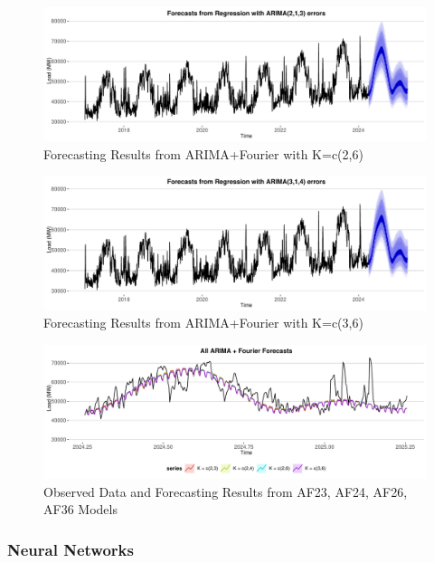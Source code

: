 \documentclass[
]{article}
\begin{document}
\begin{figure}
\centering
\includegraphics{FinalProject_Report_files/figure-latex/unnamed-chunk-10-1.pdf}
\caption{Forecasting Results from ARIMA+Fourier with K=c(2,6)}
\end{figure}

\begin{figure}
\centering
\includegraphics{FinalProject_Report_files/figure-latex/unnamed-chunk-11-1.pdf}
\caption{Forecasting Results from ARIMA+Fourier with K=c(3,6)}
\end{figure}

\begin{figure}
\centering
\includegraphics{FinalProject_Report_files/figure-latex/unnamed-chunk-12-1.pdf}
\caption{Observed Data and Forecasting Results from AF23, AF24, AF26,
AF36 Models}
\end{figure}

\newpage

\subsubsection{Neural Networks}\label{neural-networks}
\end{document}
